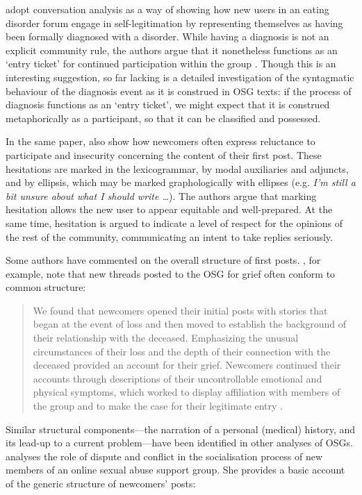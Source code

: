 \documentclass{article}
\begin{document}
\textcite{stommel_use_2011} adopt conversation analysis as a way of showing how new users in an eating disorder forum engage in self-legitimation by representing themselves as having been formally diagnosed with a disorder. While having a diagnosis is not an explicit community rule, the authors argue that it nonetheless functions as an `entry ticket' for continued participation within the group \parencite*[p.~6]{stommel_use_2011}. Though this is an interesting suggestion, so far lacking is a detailed investigation of the syntagmatic behaviour of the diagnosis event as it is construed in OSG texts: if the process of diagnosis functions as an `entry ticket', we might expect that it is construed metaphorically as a participant, so that it can be classified and possessed.

In the same paper, \citeauthor{stommel_use_2011} also show how newcomers often express reluctance to participate and insecurity concerning the content of their first post. These hesitations are marked in  the lexicogrammar, by modal auxiliaries and adjuncts, and by ellipsis, which may be marked graphologically with ellipses (e.g. \emph{I'm still a bit unsure about what I should write \dots}). The authors argue that marking hesitation allows the new user to appear equitable and well-prepared. At the same time, hesitation is argued to indicate a level of respect for the opinions of the rest of the community, communicating an intent to take replies seriously. 

Some authors have commented on the overall structure of first posts. \textcite{varga2014grieving}, for example, note that new threads posted to the OSG for grief often conform to common structure:

\begin{quote}\small\singlespacing
We found that newcomers opened their initial posts with stories that began at the event of loss and then moved to establish the background of their relationship with the deceased. Emphasizing the unusual circumstances of their loss and the depth of their connection with the deceased provided an account for their grief. Newcomers continued their accounts through descriptions of their uncontrollable emotional and physical symptoms, which worked to display affiliation with members of the group and to make the case for their legitimate entry \parencite*[p.~5]{varga2014grieving}. 
\end{quote}
%
%
Similar structural components---the narration of a personal (medical) history, and its lead-up to a current problem---have been identified in other analyses of OSGs. \textcite[p.~4]{weber_missed_2011} analyses the role of dispute and conflict in the socialisation process of new members of an online sexual abuse support group. She provides a basic account of the generic structure of newcomers' posts:
\end{document}
